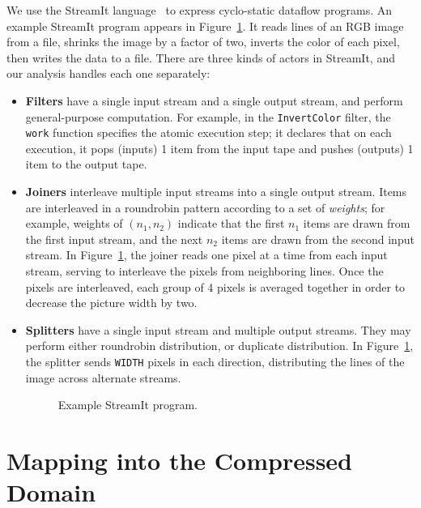 We use the StreamIt language~\cite{streamitcc} to express cyclo-static
dataflow programs.  An example StreamIt program appears in
Figure~\ref{fig:streamit}.  It reads lines of an RGB image from a
file, shrinks the image by a factor of two, inverts the color of each
pixel, then writes the data to a file.  There are three kinds of
actors in StreamIt, and our analysis handles each one separately:
\begin{itemize}

\item {\bf Filters} have a single input stream and a single output
  stream, and perform general-purpose computation.  For example, in
  the {\tt InvertColor} filter, the {\tt work} function specifies the
  atomic execution step; it declares that on each execution, it pops
  (inputs) 1 item from the input tape and pushes (outputs) 1 item to
  the output tape.

\item {\bf Joiners} interleave multiple input streams
  into a single output stream.  Items are interleaved in a roundrobin
  pattern according to a set of {\it weights}; for example, weights of
  $(n_1, n_2)$ indicate that the first $n_1$ items are drawn from the
  first input stream, and the next $n_2$ items are drawn from the
  second input stream.  In Figure~\ref{fig:streamit}, the joiner reads
  one pixel at a time from each input stream, serving to interleave
  the pixels from neighboring lines.  Once the pixels are interleaved,
  each group of 4 pixels is averaged together in order to decrease the
  picture width by two.

\item {\bf Splitters} have a single input stream and
  multiple output streams.  They may perform either roundrobin
  distribution, or duplicate distribution. In
  Figure~\ref{fig:streamit}, the splitter sends {\tt WIDTH} pixels in
  each direction, distributing the lines of the image across alternate
  streams.

\begin{figure}[t]
\caption{Example StreamIt program.
\protect\label{fig:streamit}}
\end{figure}

\end{itemize}

\section{Mapping into the Compressed Domain}

